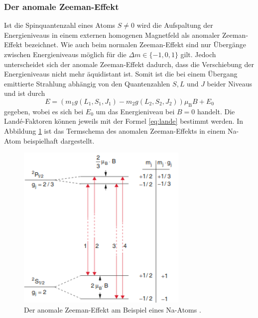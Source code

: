 \subsubsection*{Der anomale Zeeman-Effekt}
Ist die Spinquantenzahl eines Atoms $S\neq 0$ wird die Aufspaltung der Energieniveaus in einem externen homogenen Magnetfeld als anomaler Zeeman-Effekt bezeichnet. Wie auch beim normalen Zeeman-Effekt sind nur Übergänge zwischen Energieniveaus
möglich für die $\Delta m \in \{-1, 0, 1\}$ gilt. Jedoch unterscheidet sich der anomale Zeeman-Effekt dadurch, dass die Verschiebung der Energieniveaus nicht mehr äquidistant ist. Somit ist die bei einem Übergang emittierte Strahlung abhängig von 
den Quantenzahlen $S, L$ und $J$ beider Niveaus und ist durch
\begin{equation}
E=(m_1 g(L_1, S_1, J_1)-m_2g(L_2, S_2, J_2))\mu_\text{B}B + E_0
\end{equation}
gegeben, wobei es sich bei $E_0$ um das Energieniveau bei $B=0$ handelt. Die Landé-Faktoren können jeweils mit der Formel \eqref{eq:lande} bestimmt werden. In Abbildung \ref{fig:tfig4} ist das Termschema des anomalen Zeeman-Effekts in einem Na-Atom beispielhaft
dargestellt.
\begin{figure}
\centering
\includegraphics[height=8.0cm]{anomalerzeeman.png}
\caption{Der anomale Zeeman-Effekt am Beispiel eines Na-Atoms \cite{quelle01}.}
\label{fig:tfig4}
\end{figure}

